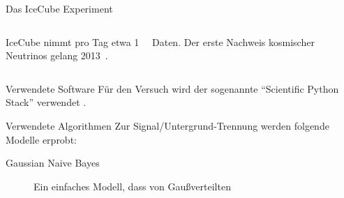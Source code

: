 \documentclass[t]{beamer}
\begin{document}
\begin{columns}[onlytextwidth]
\begin{column}{0.5\textwidth}
\begin{block}{Das IceCube Experiment}
\begin{columns}[onlytextwidth]
\begin{column}{0.48\textwidth}
            IceCube nimmt pro Tag etwa \SI{1}{\tera\byte} Daten.
            Der erste Nachweis kosmischer Neutrinos gelang 2013~\cite{icecube_science}.
          \end{column}%
        \end{columns}%
      \end{block}%
      \begin{block}{Verwendete Software}%
        Für den Versuch wird der sogenannte \enquote{Scientific Python Stack} verwendet \cite{scipy,matplotlib,sklearn,numpy}.\par
      \end{block}
      \begin{block}{Verwendete Algorithmen}
        Zur Signal/Untergrund-Trennung werden folgende Modelle erprobt:
        \begin{description}
          \item[Gaussian Naive Bayes] Ein einfaches Modell, dass von Gaußverteilten

\end{description}
\end{block}
\end{column}
\end{columns}
\end{document}
